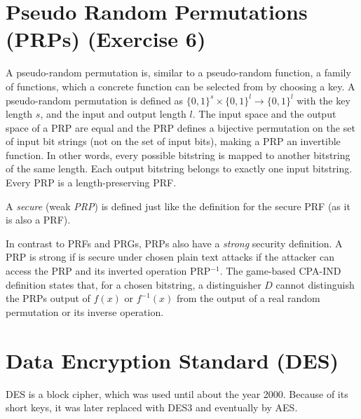 \section{Pseudo Random Permutations (PRPs) (Exercise 6)}

A pseudo-random permutation is, similar to a pseudo-random function, a family of functions, which a concrete function can be selected from by choosing a key. A pseudo-random permutation is defined as $\{0,1\}^s \times \{0,1\}^l \rightarrow \{0,1\}^l$ with the key length $s$, and the input and output length $l$. The input space and the output space of a PRP are equal and the PRP defines a bijective permutation on the set of input bit strings (not on the set of input bits), making a PRP an invertible function. In other words, every possible bitstring is mapped to another bitstring of the same length. Each output bitstring belongs to exactly one input bitstring. Every PRP is a length-preserving PRF.

A \textit{secure} (weak \textit{PRP}) is defined just like the definition for the secure PRF (as it is also a PRF).

In contrast to PRFs and PRGs, PRPs also have a \textit{strong} security definition.
A PRP is strong if is secure under chosen plain text attacks if the attacker can access the PRP and its inverted operation PRP$^{-1}$.
The game-based CPA-IND definition states that, for a chosen bitstring, a distinguisher $D$ cannot distinguish the PRPs output of $f(x)$ or $f^{-1}(x)$ from the output of a real random permutation or its inverse operation.

\section{Data Encryption Standard (DES)}

DES is a block cipher, which was used until about the year 2000. Because of its short keys, it was later replaced with DES3 and eventually by AES.

